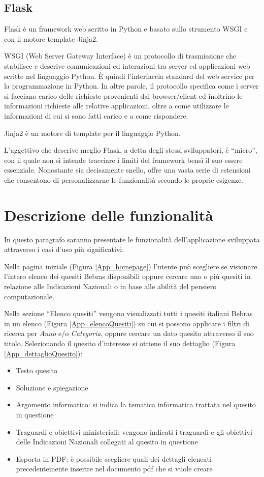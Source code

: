 \documentclass[12pt]{report}
\begin{document}
\subsection{Flask}
Flask è un framework web scritto in Python e basato sullo strumento WSGI e con il motore template Jinja2.

WSGI (Web Server Gateway Interface) è un protocollo di trasmissione che stabilisce e descrive comunicazioni ed interazioni tra server ed applicazioni web scritte nel linguaggio Python. \`{E} quindi l'interfaccia standard del web service per la programmazione in Python.
In altre parole, il protocollo specifica come i server si facciano carico delle richieste provenienti dai browser/client ed inoltrino le informazioni richieste alle relative applicazioni, oltre a come utilizzare le informazioni di cui si sono fatti carico e a come rispondere.

Jinja2 è un motore di template per il linguaggio Python.


L’aggettivo che descrive meglio Flask, a detta degli stessi sviluppatori, è “micro”, con il quale non si intende tracciare i limiti del framework bensì il suo essere essenziale. Nonostante sia decisamente snello, offre una vasta serie di estensioni che consentono di personalizzarne le funzionalità secondo le proprie esigenze.

\section{Descrizione delle funzionalità}
In questo paragrafo saranno presentate le funzionalità dell'applicazione sviluppata attraverso i casi d'uso più significativi.


Nella pagina iniziale (Figura \ref{App_homepage}) l'utente può scegliere se visionare l'intero elenco dei quesiti Bebras disponibili oppure cercare uno o più quesiti in relazione alle Indicazioni Nazionali o in base alle abilità del pensiero computazionale.


Nella sezione ``Elenco quesiti'' vengono visualizzati tutti i quesiti italiani Bebras in un elenco (Figura  \ref{App_elencoQuesiti}) su cui si possono applicare i filtri di ricerca per \textit{Anno} e/o \textit{Categoria}, oppure cercare un dato quesito attraverso il suo titolo.
Selezionando il quesito d'interesse si ottiene il suo dettaglio (Figura \ref{App_dettaglioQuesito}):

\begin{itemize}
	\item Testo quesito 
	\item Soluzione e spiegazione
	\item Argomento informatico: si indica la tematica informatica trattata nel quesito in questione
	\item Traguardi e obiettivi ministeriali: vengono indicati i traguardi e gli obiettivi delle Indicazioni Nazionali collegati al quesito in questione
	\item Esporta in PDF: è possibile scegliere quali dei dettagli elencati precedentemente inserire nel documento pdf che si vuole creare
\end{itemize}
\end{document}
